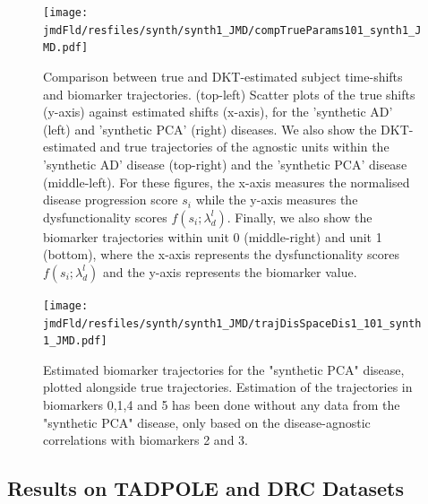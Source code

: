 \documentclass{llncs}
\begin{document}
\begin{figure}
\texttt{[image: \\jmdFld/resfiles/synth/synth1\_JMD/compTrueParams101\_synth1\_JMD.pdf]}
 \caption[DKT Simulation Results - Comparison between true and DKT-estimated biomarker trajectories and subject time-shifts.]{Comparison between true and DKT-estimated subject time-shifts and biomarker trajectories. (top-left) Scatter plots of the true shifts (y-axis) against estimated shifts (x-axis), for the 'synthetic AD' (left) and 'synthetic PCA' (right) diseases. We also show the DKT-estimated and true trajectories of the agnostic units within the 'synthetic AD' disease (top-right) and the 'synthetic PCA' disease (middle-left). For these figures, the x-axis measures the normalised disease progression score $s_i$ while the y-axis measures the dysfunctionality scores $f(s_i;\lambda_d^l)$. Finally, we also show the biomarker trajectories within unit 0 (middle-right) and unit 1 (bottom), where the x-axis represents the dysfunctionality scores $f(s_i;\lambda_d^l)$ and the y-axis represents the biomarker value.}
 \label{fig:dktSynthTrajCompTrue}
\end{figure}

\begin{figure}
\texttt{[image: \\jmdFld/resfiles/synth/synth1\_JMD/trajDisSpaceDis1\_101\_synth1\_JMD.pdf]}
 \caption[Estimated biomarker trajectories for the "synthetic PCA" disease, plotted alongside true trajectories]{Estimated biomarker trajectories for the "synthetic PCA" disease, plotted alongside true trajectories. Estimation of the trajectories in biomarkers 0,1,4 and 5 has been done without any data from the "synthetic PCA" disease, only based on the disease-agnostic correlations with biomarkers 2 and 3.}
 \label{fig:dktSynthTrajDrcSpace}
\end{figure}



\subsection{Results on TADPOLE and DRC Datasets}
\label{sec:dktResTadDrc}
\end{document}
